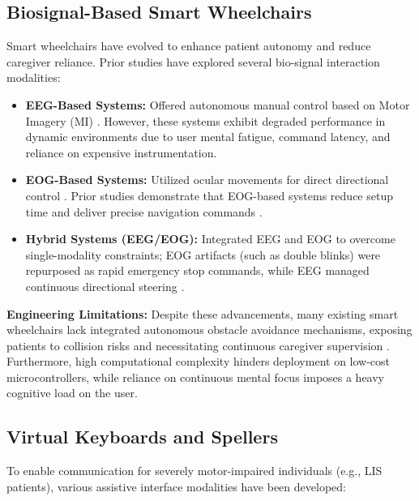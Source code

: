 \FloatBarrier
\subsection{Biosignal-Based Smart Wheelchairs}
\label{subsec:biosignal_smart_wheelchairs}

Smart wheelchairs have evolved to enhance patient autonomy and reduce caregiver reliance. Prior studies have explored several bio-signal interaction modalities:

\begin{itemize}
    \item \textbf{EEG-Based Systems:} Offered autonomous manual control based on Motor Imagery (MI) \cite{liu2024multimodal}. However, these systems exhibit degraded performance in dynamic environments due to user mental fatigue, command latency, and reliance on expensive instrumentation.
    \item \textbf{EOG-Based Systems:} Utilized ocular movements for direct directional control \cite{barea2002eog}. Prior studies demonstrate that EOG-based systems reduce setup time and deliver precise navigation commands \cite{alzahrani2026design}.
    \item \textbf{Hybrid Systems (EEG/EOG):} Integrated EEG and EOG to overcome single-modality constraints; EOG artifacts (such as double blinks) were repurposed as rapid emergency stop commands, while EEG managed continuous directional steering \cite{hosni2018eeg, hybrid2019wheelchair}.
\end{itemize}

\textbf{Engineering Limitations:} Despite these advancements, many existing smart wheelchairs lack integrated autonomous obstacle avoidance mechanisms, exposing patients to collision risks and necessitating continuous caregiver supervision \cite{smartwheelchair2019obstacle, aiiot2024wheelchair}. Furthermore, high computational complexity hinders deployment on low-cost microcontrollers, while reliance on continuous mental focus imposes a heavy cognitive load on the user.

\FloatBarrier
\subsection{Virtual Keyboards and Spellers}
\label{subsec:virtual_keyboards_spellers}

To enable communication for severely motor-impaired individuals (e.g., LIS patients), various assistive interface modalities have been developed:

